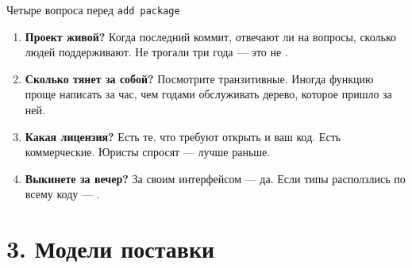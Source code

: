 \documentclass[aspectratio=169,10pt,t]{beamer}
\begin{document}
\begin{frame}{Четыре вопроса перед \texttt{add package}}
  \slidetop

  \begin{enumerate}\itemsep0.6em
    \item \textbf{Проект живой?} Когда последний коммит, отвечают ли на
          вопросы, сколько людей поддерживают. Не трогали три года --- это
          не .
    \item \textbf{Сколько тянет за собой?} Посмотрите транзитивные. Иногда
          функцию проще написать за час, чем годами обслуживать дерево,
          которое пришло за ней.
    \item \textbf{Какая лицензия?} Есть те, что требуют открыть и ваш код.
          Есть коммерческие. Юристы спросят --- лучше раньше.
    \item \textbf{Выкинете за вечер?} За своим интерфейсом --- да. Если типы
          расползлись по всему коду --- .
  \end{enumerate}

  \slidegap
\end{frame}

\begin{frame}[plain]
\end{frame}

\section{3. Модели поставки}
\end{document}

